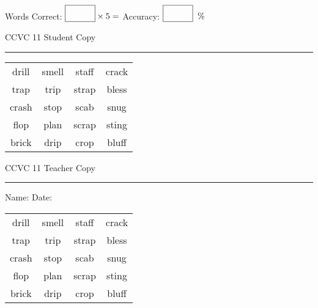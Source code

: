 \documentclass{memoir}
\begin{document}
\small

Words Correct: $\fbox{\phantom{\huge 100}} \times 5 = $ Accuracy: $\fbox{\phantom{\huge 100}}\;\; \%$ 

\vfill

\newpage


\footnotesize \noindent
CCVC 11 \hfill Student Copy
\smallskip
\hrule

\Large

\setlength{\tabcolsep}{14pt}
\def\arraystretch{3}

{\selectfont


\begin{vplace}[0.5]
\begin{center}
\begin{tabular}{cccc}
drill & smell & staff            & crack       \\
trap & trip & strap & bless \\
crash & stop & scab & snug \\
flop & plan & scrap & sting \\
brick       & drip & crop & bluff \\
\end{tabular}
\end{center}
\end{vplace}

}

\newpage

\footnotesize \noindent
CCVC 11 \hfill Teacher Copy
\smallskip
\hrule

\small

\vfill

\noindent
Name: \underline{\hspace{1.75in}} \hfill Date: \underline{\hspace{1in}}

\Large

{\selectfont


\begin{vplace}[0.5]
\begin{center}
\begin{tabular}{cccc}
drill & smell & staff            & crack       \\
trap & trip & strap & bless \\
crash & stop & scab & snug \\
flop & plan & scrap & sting \\
brick       & drip & crop & bluff \\
\end{tabular}
\end{center}
\end{vplace}



}
\end{document}
